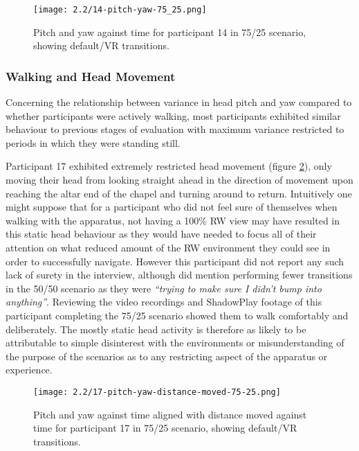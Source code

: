 \begin{figure}
	\begin{center}
	\texttt{[image: 2.2/14-pitch-yaw-75\_25.png]}
	\caption{Pitch and yaw against time for participant 14 in 75/25 scenario, showing default/VR transitions.}
	\label{14-pitch-yaw-75_25.png}
	\end{center}
\end{figure}


\newpage

\subsubsection{Walking and Head Movement}

Concerning the relationship between variance in head pitch and yaw compared to whether participants were actively walking, most participants exhibited similar behaviour to previous stages of evaluation with maximum variance restricted to periods in which they were standing still.

Participant 17 exhibited extremely restricted head movement (figure \ref{17-pitch-yaw-distance-moved-75-25.png}), only moving their head from looking straight ahead in the direction of movement upon reaching the altar end of the chapel and turning around to return. Intuitively one might suppose that for a participant who did not feel sure of themselves when walking with the apparatus, not having a 100\% RW view may have resulted in this static head behaviour as they would have needed to focus all of their attention on what reduced amount of the RW environment they could see in order to successfully navigate. However this participant did not report any such lack of surety in the interview, although did mention performing fewer transitions in the 50/50 scenario as they were \textit{``trying to make sure I didn't bump into anything''}. Reviewing the video recordings and ShadowPlay footage of this participant completing the 75/25 scenario showed them to walk comfortably and deliberately. The mostly static head activity is therefore as likely to be attributable to simple disinterest with the environments or misunderstanding of the purpose of the scenarios as to any restricting aspect of the apparatus or experience.

\begin{figure}[h]
	\begin{center}
	\texttt{[image: 2.2/17-pitch-yaw-distance-moved-75-25.png]}
	\caption{Pitch and yaw against time aligned with distance moved against time for participant 17 in 75/25 scenario, showing default/VR transitions.}
	\label{17-pitch-yaw-distance-moved-75-25.png}
	\end{center}
\end{figure}

